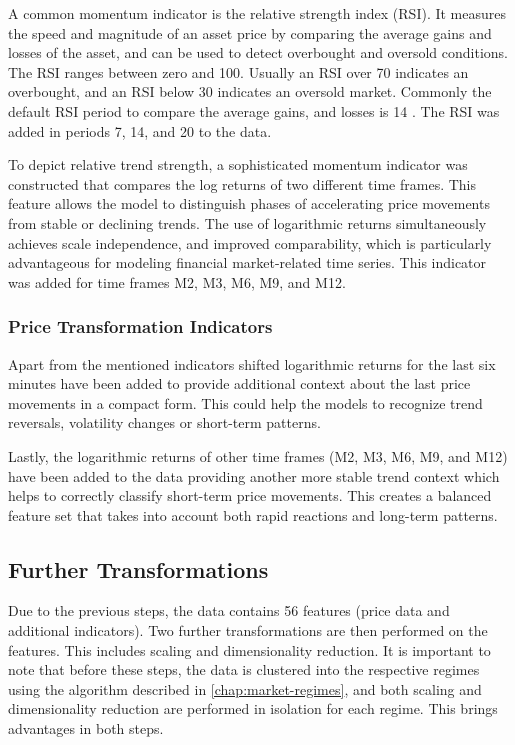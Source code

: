 A common momentum indicator is the relative strength index (RSI).
It measures the speed and magnitude of an asset price by comparing the average gains and losses of the asset, and can be used to detect overbought and oversold conditions.
The RSI ranges between zero and 100.
Usually an RSI over 70 indicates an overbought, and an RSI below 30 indicates an oversold market.
Commonly the default RSI period to compare the average gains, and losses is 14 \cite{investopia-rsi}.
The RSI was added in periods 7, 14, and 20 to the data.

To depict relative trend strength, a sophisticated momentum indicator was constructed that compares the log returns of two different time frames.
This feature allows the model to distinguish phases of accelerating price movements from stable or declining trends.
The use of logarithmic returns simultaneously achieves scale independence, and improved comparability, which is particularly advantageous for modeling financial market-related time series.
This indicator was added for time frames M2, M3, M6, M9, and M12.

\subsubsection{Price Transformation Indicators}

Apart from the mentioned indicators shifted logarithmic returns for the last six minutes have been added to provide additional context about the last price movements in a compact form.
This could help the models to recognize trend reversals, volatility changes or short-term patterns.

Lastly, the logarithmic returns of other time frames (M2, M3, M6, M9, and M12) have been added to the data providing another more stable trend context which helps to correctly classify short-term price movements.
This creates a balanced feature set that takes into account both rapid reactions and long-term patterns.

\subsection{Further Transformations}

Due to the previous steps, the data contains 56 features (price data and additional indicators).
Two further transformations are then performed on the features.
This includes scaling and dimensionality reduction.
It is important to note that before these steps, the data is clustered into the respective regimes using the algorithm described in \autoref{chap:market-regimes}, and both scaling and dimensionality reduction are performed in isolation for each regime.
This brings advantages in both steps.

